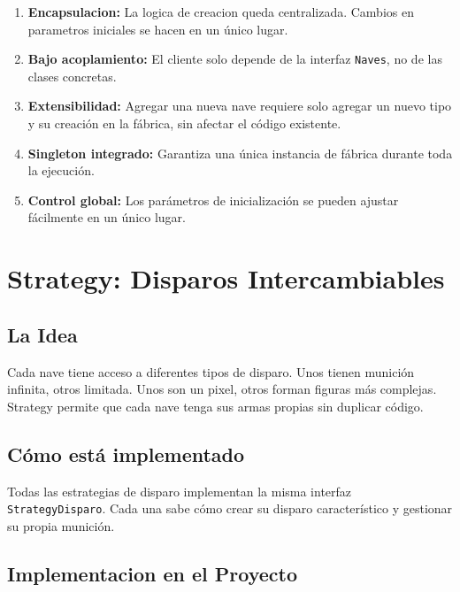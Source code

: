\documentclass[12pt]{article}
\begin{document}
\begin{enumerate}
    \item \textbf{Encapsulacion:} La logica de creacion queda centralizada. Cambios en parametros iniciales se hacen en un único lugar.
    
    \item \textbf{Bajo acoplamiento:} El cliente solo depende de la interfaz \texttt{Naves}, no de las clases concretas.
    
    \item \textbf{Extensibilidad:} Agregar una nueva nave requiere solo agregar un nuevo tipo y su creación en la fábrica, sin afectar el código existente.
    
    \item \textbf{Singleton integrado:} Garantiza una única instancia de fábrica durante toda la ejecución.
    
    \item \textbf{Control global:} Los parámetros de inicialización se pueden ajustar fácilmente en un único lugar.
\end{enumerate}

\newpage
\section{Strategy: Disparos Intercambiables}

\subsection{La Idea}

Cada nave tiene acceso a diferentes tipos de disparo. Unos tienen munición infinita, otros limitada. Unos son un pixel, otros forman figuras más complejas. Strategy permite que cada nave tenga sus armas propias sin duplicar código.

\subsection{Cómo está implementado}

Todas las estrategias de disparo implementan la misma interfaz \texttt{StrategyDisparo}. Cada una sabe cómo crear su disparo característico y gestionar su propia munición.

\subsection{Implementacion en el Proyecto}
\end{document}
